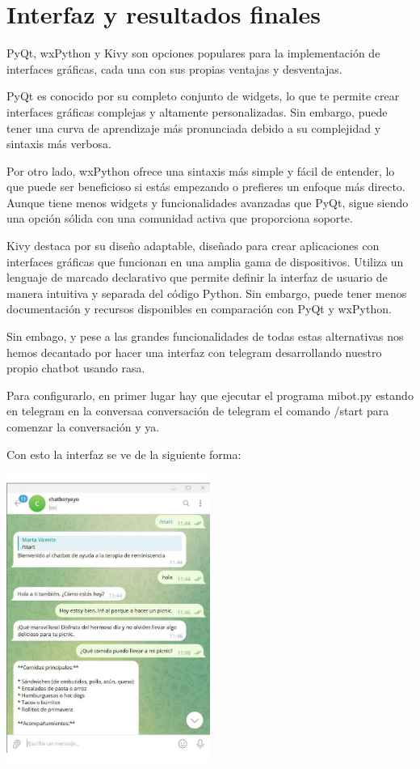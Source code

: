 \chapter{Interfaz y resultados finales}
\label{cap:Interfaz y resultados finales}

PyQt, wxPython y Kivy son opciones populares para la implementación de interfaces gráficas, cada una con sus propias ventajas y desventajas.

PyQt es conocido por su completo conjunto de widgets, lo que te permite crear interfaces gráficas complejas y altamente personalizadas. Sin embargo, puede tener una curva de aprendizaje más pronunciada debido a su complejidad y sintaxis más verbosa.

Por otro lado, wxPython ofrece una sintaxis más simple y fácil de entender, lo que puede ser beneficioso si estás empezando o prefieres un enfoque más directo. Aunque tiene menos widgets y funcionalidades avanzadas que PyQt, sigue siendo una opción sólida con una comunidad activa que proporciona soporte.

Kivy destaca por su diseño adaptable, diseñado para crear aplicaciones con interfaces gráficas que funcionan en una amplia gama de dispositivos. Utiliza un lenguaje de marcado declarativo que permite definir la interfaz de usuario de manera intuitiva y separada del código Python. Sin embargo, puede tener menos documentación y recursos disponibles en comparación con PyQt y wxPython.

Sin embago, y pese a las grandes funcionalidades de todas estas alternativas nos hemos decantado por hacer una interfaz con telegram desarrollando nuestro propio chatbot usando rasa. 

Para configurarlo, en primer lugar hay que ejecutar el programa mibot.py estando en telegram en la conversaa conversación de telegram el comando /start para comenzar la conversación y ya. 


Con esto la interfaz se ve de la siguiente forma: 

\includegraphics[width=0.5\textwidth]{Imagenes/telegram1}


